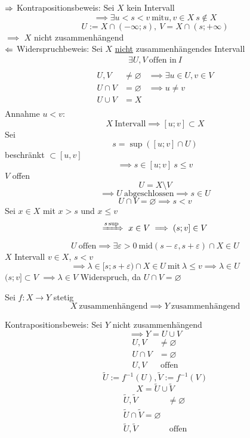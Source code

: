 \begin{Bew}
  $\Rightarrow$ Kontrapositionsbeweis: Sei $X$ kein Intervall
  \[\implies\exists u<s<v\ \text{mit} u,v\in X\ s\not\in X\]
  \[U:=X\cap\left( -\infty;s \right),\ V=X\cap\left( s;+\infty \right)\]
  $\implies$ $X$ nicht zusammenhängend\\
  $\Leftarrow$ Widerspruchbeweis: Sei $X$ \underline{nicht} zusammenhängendes Intervall
  \begin{gather*}
    \exists U,V\ \text{offen in}\ I\\
  \end{gather*}
  \begin{align*}
    U,V&\neq \varnothing&\implies\exists u\in U, v\in V\\
    U\cap V&=\varnothing&\implies u\neq v\\
    U\cup V&=X&\\
  \end{align*}
  Annahme $u<v$:
  \[X\ \text{Intervall}\implies [u;v]\subset X\]
  Sei
  \[s=\sup\left( [u;v]\cap U \right)\]
  beschränkt $\subset [u,v]$
  \[\implies s\in [u;v]\ s\leq v\]
  $V$ offen
  \[U=X\setminus V\]
  \[\implies U\ \text{abgeschlossen} \implies s\in U\]
  \[U\cap V=\varnothing\implies s<v\]
  Sei $x\in X$ mit $x>s$ und $x\leq v$
  \[\xRightarrow{s\sup}\ x\in V\implies (s;v]\in V\]
  \[U\ \text{offen}\implies \exists \varepsilon>0\ \text{mid} \left( s-\varepsilon, s+\varepsilon \right)\cap X\in U\]
  $X$ Intervall $v\in X$, $s<v$
  \[\implies \lambda\in [s;s+\varepsilon)\cap X\in U\ \text{mit}\ \lambda\leq v\implies \lambda\in U\]
  $(s;v]\subset V$ $\implies \lambda\in V$ Widerspruch, da $U\cap V=\varnothing$
\end{Bew}
\begin{Sat}
  Sei $f:X\to Y$ stetig
  \[X\ \text{zusammenhängend}\implies Y\ \text{zusammenhängend}\]
\end{Sat}
\begin{Bew}
  Kontrapositionsbeweis: Sei $Y$ nicht zusammenhängend
  \[\implies Y=U\cup V\]
  \begin{align*}
    U,V&\neq\varnothing\\
    U\cap V&=\varnothing\\
    U,V&\ \text{offen}
  \end{align*}
  \[\tilde U:=f^{-1}(U),\tilde V:=f^{-1}(V)\]
  \[X=\tilde U\cup \tilde V\]
  \begin{align*}
    \tilde U, \tilde V&\neq \varnothing\\
    \tilde U\cap \tilde V=\varnothing\\
    \tilde U, \tilde V&\ \text{offen}
  \end{align*}
\end{Bew}
